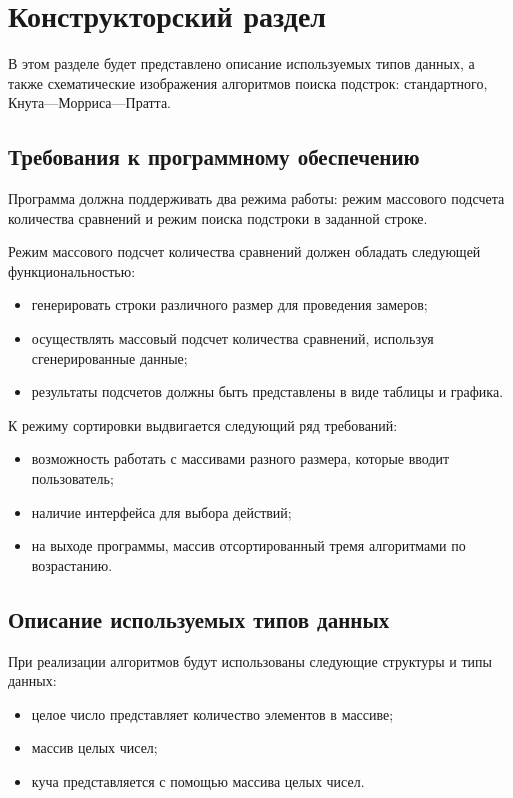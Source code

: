 \chapter{Конструкторский раздел}

В этом разделе будет представлено описание используемых типов данных, а также схематические изображения алгоритмов поиска подстрок: стандартного, Кнута---Морриса---Пратта.

\section{Требования к программному обеспечению}

Программа должна поддерживать два режима работы: режим массового подсчета  количества сравнений и режим поиска подстроки в заданной строке.

Режим массового подсчет количества сравнений должен обладать следующей функциональностью:
\begin{itemize}
	\item генерировать строки различного размер для проведения замеров;
	\item осуществлять массовый подсчет количества сравнений, используя сгенерированные данные;
	\item результаты подсчетов должны быть представлены в виде таблицы и графика.
\end{itemize}

К режиму сортировки выдвигается следующий ряд требований:
\begin{itemize}
	\item возможность работать с массивами разного размера, которые вводит пользователь;
	\item наличие интерфейса для выбора действий;
	\item на выходе программы, массив отсортированный тремя алгоритмами по возрастанию.
\end{itemize}

\section{Описание используемых типов данных}

При реализации алгоритмов будут использованы следующие структуры и типы данных:
\begin{itemize}
	\item целое число представляет количество элементов в массиве;
	\item массив целых чисел;
	\item куча представляется с помощью массива целых чисел.
\end{itemize}

